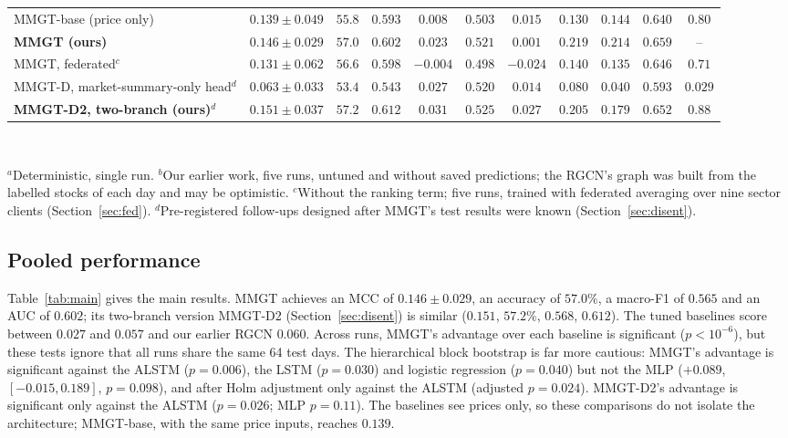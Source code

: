 \documentclass[conference]{IEEEtran}
\begin{document}
\begin{table}[t]
{\begin{tabular}{lcccccccccc}
\midrule
MMGT-base (price only) & $0.139\pm0.049$ & $55.8$ & $0.593$ & $0.008$ & $0.503$ & $0.015$ & $0.130$ & $0.144$ & $0.640$ & $0.80$ \\
\textbf{MMGT (ours)} & $0.146\pm0.029$ & $57.0$ & $0.602$ & $0.023$ & $0.521$ & $0.001$ & $\mathbf{0.219}$ & $\mathbf{0.214}$ & $\mathbf{0.659}$ & -- \\
MMGT, federated$^{c}$ & $0.131\pm0.062$ & $56.6$ & $0.598$ & $-0.004$ & $0.498$ & $-0.024$ & $0.140$ & $0.135$ & $0.646$ & $0.71$ \\
MMGT-D, market-summary-only head$^{d}$ & $0.063\pm0.033$ & $53.4$ & $0.543$ & $0.027$ & $0.520$ & $0.014$ & $0.080$ & $0.040$ & $0.593$ & $0.029$ \\
\textbf{MMGT-D2, two-branch (ours)}$^{d}$ & $\mathbf{0.151\pm0.037}$ & $\mathbf{57.2}$ & $\mathbf{0.612}$ & $\mathbf{0.031}$ & $\mathbf{0.525}$ & $\mathbf{0.027}$ & $0.205$ & $0.179$ & $0.652$ & $0.88$ \\
\bottomrule
\end{tabular}}
\\[3pt]
\parbox{\textwidth}{\footnotesize $^{a}$Deterministic, single run.
$^{b}$Our earlier work, five runs, untuned and without saved predictions; the RGCN's
graph was built from the labelled stocks of each day and may be optimistic.
$^{c}$Without the ranking term; five runs, trained with federated averaging over
nine sector clients (Section~\ref{sec:fed}).
$^{d}$Pre-registered follow-ups designed after MMGT's test results were known
(Section~\ref{sec:disent}).}
\end{table}

\subsection{Pooled performance}

Table~\ref{tab:main} gives the main results. MMGT achieves an MCC of
$0.146\pm0.029$, an accuracy of $57.0\%$, a macro-F1 of $0.565$ and an AUC of
$0.602$; its two-branch version MMGT-D2 (Section~\ref{sec:disent}) is similar
($0.151$, $57.2\%$, $0.568$, $0.612$). The tuned baselines score between
$0.027$ and $0.057$ and our earlier RGCN $0.060$. Across runs, MMGT's advantage over
each baseline is significant ($p<10^{-6}$), but these tests ignore that all runs
share the same 64 test days. The hierarchical block bootstrap is far more cautious: MMGT's
advantage is significant against the ALSTM ($p=0.006$), the LSTM ($p=0.030$) and
logistic regression ($p=0.040$) but not the MLP ($+0.089$, $[-0.015, 0.189]$,
$p=0.098$), and after Holm adjustment only against the ALSTM (adjusted $p=0.024$).
MMGT-D2's advantage is significant only against the ALSTM ($p=0.026$; MLP
$p=0.11$). The baselines see prices only, so these comparisons do not isolate the
architecture; MMGT-base, with the same price inputs, reaches $0.139$.
\end{document}
